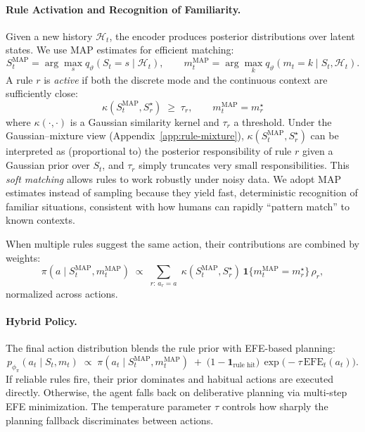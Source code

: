 \documentclass{article} %
\newcommand{\revise}[1]{#1}
\begin{document}
\paragraph{Rule Activation and Recognition of Familiarity.}
Given a new history \(\mathcal H_t\), the encoder produces posterior distributions over latent states.  
We use MAP estimates for efficient matching:
{\small \[
S_t^{\text{MAP}}=\arg\max_s q_\vartheta(S_t=s\mid \mathcal H_t),\qquad
m_t^{\text{MAP}}=\arg\max_k q_\vartheta(m_t=k\mid S_t,\mathcal H_t).
\]}
A rule \(r\) is \emph{active} if both the discrete mode and the continuous context are sufficiently close:
\[
\kappa(S_t^{\text{MAP}}, S_r^\star)\; \ge \;\tau_r,\qquad
m_t^{\text{MAP}} = m_r^\star
\]
\revise{where \(\kappa(\cdot,\cdot)\) is a Gaussian similarity kernel and \(\tau_r\) a threshold. Under the Gaussian–mixture view (Appendix~\ref{app:rule-mixture}), \(\kappa(S_t^{\text{MAP}}, S_r^\star)\) can be interpreted as (proportional to) the posterior responsibility of rule \(r\) given a Gaussian prior over \(S_t\), and \(\tau_r\) simply truncates very small responsibilities.} This \emph{soft matching} allows rules to work robustly under noisy data. We adopt MAP estimates instead of sampling because they yield fast, deterministic recognition of familiar situations, consistent with how humans can rapidly “pattern match” to known contexts.

When multiple rules suggest the same action, their contributions are combined by weights:
{\small\[
\pi(a\mid S_t^{\mathrm{MAP}}, m_t^{\mathrm{MAP}})\;\propto\;
\sum_{r:\,a_r=a}\;\kappa(S_t^{\mathrm{MAP}},S_r^\star)\,\mathbf{1}\{m_t^{\mathrm{MAP}}=m_r^\star\}\,\rho_r,
\]}
normalized across actions.  
\paragraph{Hybrid Policy.}
The final action distribution blends the rule prior with EFE-based planning:
\begin{equation}
\label{eq:policy_blend}
p_{\phi_{\pi}}(a_t\mid S_t,m_t)\;\propto\;
\pi(a_t\mid S_t^{\text{MAP}},m_t^{\text{MAP}})
\;+\;\big(1-\mathbf{1}_{\text{rule hit}}\big)\,\exp\!\big(-\tau\,\text{EFE}_t(a_t)\big).
\end{equation}
If reliable rules fire, their prior dominates and habitual actions are executed directly.  
Otherwise, the agent falls back on deliberative planning via multi-step EFE minimization.  
The temperature parameter \(\tau\) controls how sharply the planning fallback discriminates between actions.  
\end{document}
